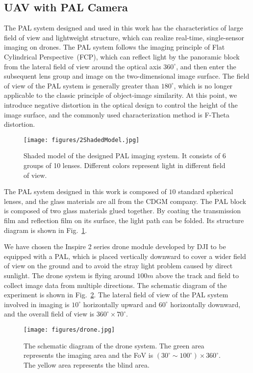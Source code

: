 \documentclass[letterpaper, 10 pt, conference]{ieeeconf}
\begin{document}
\subsection{UAV with PAL Camera}

The PAL system designed and used in this work has the characteristics of large field of view and lightweight structure, which can realize real-time, single-sensor imaging on drones.
The PAL system follows the imaging principle of Flat Cylindrical Perspective~(FCP), which can reflect light by the panoramic block from the lateral field of view around the optical axis $360^\circ$, and then enter the subsequent lens group and image on the two-dimensional image surface. The field of view of the PAL system is generally greater than $180^\circ$, which is no longer applicable to the classic principle of object-image similarity. At this point, we introduce negative distortion in the optical design to control the height of the image surface, and the commonly used characterization method is F-Theta distortion.

\begin{figure}[!t]
    \centerline{\texttt{[image: figures/2ShadedModel.jpg]}}
    \caption{Shaded model of the designed PAL imaging system. It consists of 6 groups of 10 lenses. Different colors represent light in different field of view. }
    \label{fig:1}
\end{figure}

The PAL system designed in this work is composed of $10$ standard spherical lenses, and the glass materials are all from the CDGM company.
The PAL block is composed of two glass materials glued together.
By coating the transmission film and reflection film on its surface, the light path can be folded. Its structure diagram is shown in Fig.~\ref{fig:1}. 

We have chosen the Inspire 2 series drone module developed by DJI to be equipped with a PAL, which is placed vertically downward to cover a wider field of view on the ground and to avoid the stray light problem caused by direct sunlight. The drone system is flying around $100m$ above the track and field to collect image data from multiple directions. The schematic diagram of the experiment is shown in Fig.~\ref{fig:2}. The lateral field of view of the PAL system involved in imaging is $10^\circ$ horizontally upward and $60^\circ$ horizontally downward, and the overall field of view is $360^\circ\times70^\circ$.

\begin{figure}[!t]
    \centerline{\texttt{[image: figures/drone.jpg]}}
    \caption{The schematic diagram of the drone system. The green area represents the imaging area and the FoV is $(30^\circ\sim100^\circ)\times360^\circ$. The yellow area represents the blind area.}
    \label{fig:2}
\end{figure}
\end{document}
